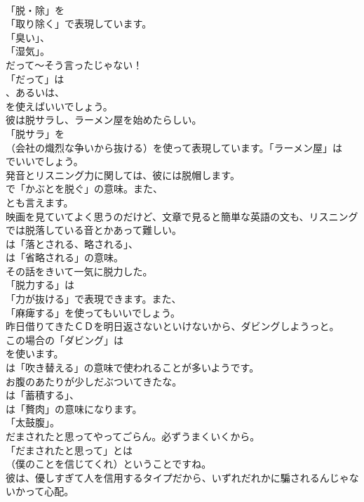 \documentclass[8pt]{extreport}
\begin{document}
\begin{CJK}{UTF8}{min}
\\	「脱・除」を
\\	「取り除く」で表現しています。
\\	「臭い」、
\\	「湿気」。	
\\	だって～そう言ったじゃない！ 
\\	「だって」は
\\	、あるいは、
\\	を使えばいいでしょう。	
\\	彼は脱サラし、ラーメン屋を始めたらしい。 
\\	「脱サラ」を
\\	（会社の熾烈な争いから抜ける）を使って表現しています。「ラーメン屋」は
\\	でいいでしょう。	
\\	発音とリスニング力に関しては、彼には脱帽します。 
\\	で「かぶとを脱ぐ」の意味。また、
\\	とも言えます。	
\\	映画を見ていてよく思うのだけど、文章で見ると簡単な英語の文も、リスニングでは脱落している音とかあって難しい。 
\\	は「落とされる、略される」、
\\	は「省略される」の意味。	
\\	その話をきいて一気に脱力した。 
\\	「脱力する」は
\\	「力が抜ける」で表現できます。また、
\\	「麻痺する」を使ってもいいでしょう。	
\\	昨日借りてきたＣＤを明日返さないといけないから、ダビングしようっと。 
\\	この場合の「ダビング」は
\\	を使います。
\\	は「吹き替える」の意味で使われることが多いようです。	
\\	お腹のあたりが少しだぶついてきたな。 
\\	は「蓄積する」、
\\	は「贅肉」の意味になります。
\\	「太鼓腹」。	
\\	だまされたと思ってやってごらん。必ずうまくいくから。 
\\	「だまされたと思って」とは 
\\	（僕のことを信じてくれ）ということですね。	
\\	彼は、優しすぎて人を信用するタイプだから、いずれだれかに騙されるんじゃないかって心配。 

\end{CJK}
\end{document}

